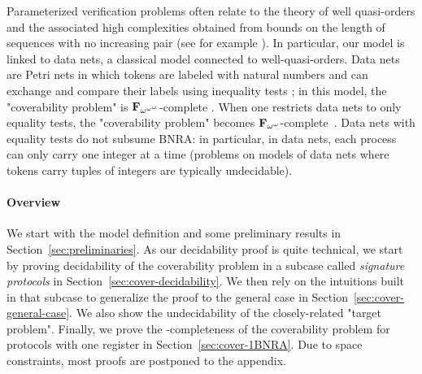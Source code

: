Parameterized verification problems often relate to the theory of well quasi-orders
and the associated high complexities obtained from bounds on the length of sequences with no increasing pair (see for example \cite{WSTS}). 
In particular, our model is linked to data nets, a classical model connected to well-quasi-orders. Data nets are Petri nets in which tokens are labeled with natural numbers and can exchange and compare their labels using inequality tests \cite{LazicNORW08}; in this model, the "coverability problem" is $\mathbf{F}_{\omega^{\omega^{\omega}}}$-complete \cite{datanetsinequalityfomegaomegaomega}. When one restricts data nets to only equality tests, the "coverability problem" becomes $\mathbf{F}_{\omega^{\omega}}$-complete~\cite{Rosa-Velardo17}. Data nets with equality tests do not subsume BNRA: in particular, in data nets, each process can only carry one integer at a time (problems on models of data nets where tokens carry tuples of integers are typically undecidable).

\paragraph*{Overview}
We start with the model definition and some preliminary results in Section~\ref{sec:preliminaries}. As our decidability proof is quite technical, we start by proving decidability of the coverability problem in a subcase called \emph{signature protocols} in Section~\ref{sec:cover-decidability}.
We then rely on the intuitions built in that subcase to generalize the proof to the general case in Section~\ref{sec:cover-general-case}. We also show the undecidability of the closely-related "target problem".
Finally, we prove the \NP-completeness of the coverability problem for protocols with one register in Section~\ref{sec:cover-1BNRA}.
Due to space constraints, most proofs are postponed to the appendix.

